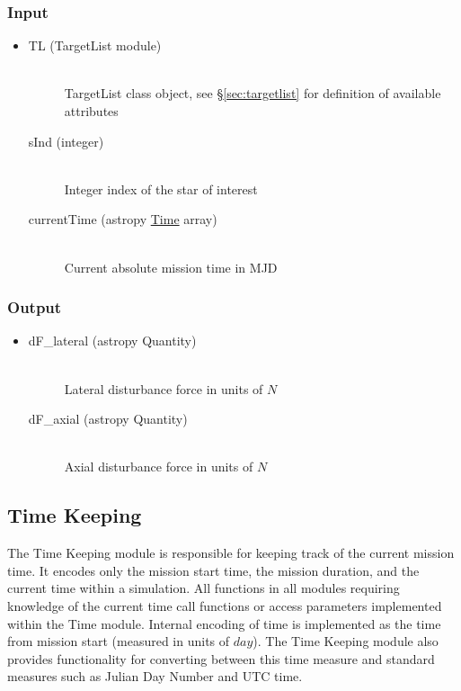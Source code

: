 \documentclass[cleanfoot]{asme2ej}
\begin{document}
\subsubsection*{Input}
\begin{itemize}
\item
\begin{description}
    \item[TL (TargetList module)] \hfill \\ TargetList class object, see \S\ref{sec:targetlist} for definition of available attributes
    \item[sInd (integer)] \hfill \\ Integer index of the star of interest
    \item[currentTime (astropy \href{http://astropy.readthedocs.org/en/latest/time/index.html}{Time} array)] \hfill \\ Current absolute mission time in MJD
\end{description}
\end{itemize}

\subsubsection*{Output}
\begin{itemize}
\item 
\begin{description}
    \item[dF\_lateral (astropy Quantity)] \hfill \\ Lateral disturbance force in units of $N$
    \item[dF\_axial (astropy Quantity)] \hfill \\ Axial disturbance force in units of $N$
\end{description}
\end{itemize}



\subsection{Time Keeping} \label{sec:timekeeping}
The Time Keeping module is responsible for keeping track of the current mission time.  It encodes only the mission start time, the mission duration, and the current time within a simulation.  All functions in all modules requiring knowledge of the current time call functions or access parameters implemented within the Time module.  Internal encoding of time is implemented as the time from mission start (measured in units of $ day $).  The Time Keeping module also provides functionality for converting between this time measure and standard measures such as Julian Day Number and UTC time.
 
\end{document}
